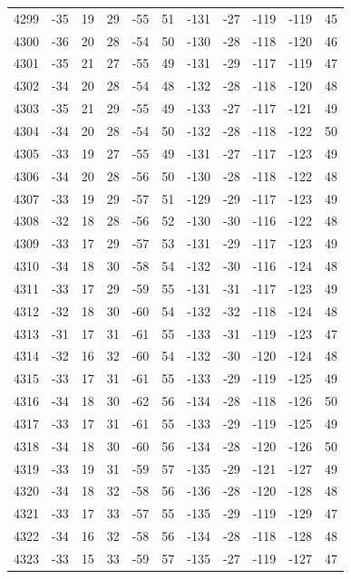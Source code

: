 \begin{table}[H]
\begin{tabular}{lllllllllll}
4299 & -35 & 19 & 29 & -55 & 51 & -131 & -27 & -119 & -119 & 45 \\
4300 & -36 & 20 & 28 & -54 & 50 & -130 & -28 & -118 & -120 & 46 \\
4301 & -35 & 21 & 27 & -55 & 49 & -131 & -29 & -117 & -119 & 47 \\
4302 & -34 & 20 & 28 & -54 & 48 & -132 & -28 & -118 & -120 & 48 \\
4303 & -35 & 21 & 29 & -55 & 49 & -133 & -27 & -117 & -121 & 49 \\
4304 & -34 & 20 & 28 & -54 & 50 & -132 & -28 & -118 & -122 & 50 \\
4305 & -33 & 19 & 27 & -55 & 49 & -131 & -27 & -117 & -123 & 49 \\
4306 & -34 & 20 & 28 & -56 & 50 & -130 & -28 & -118 & -122 & 48 \\
4307 & -33 & 19 & 29 & -57 & 51 & -129 & -29 & -117 & -123 & 49 \\
4308 & -32 & 18 & 28 & -56 & 52 & -130 & -30 & -116 & -122 & 48 \\
4309 & -33 & 17 & 29 & -57 & 53 & -131 & -29 & -117 & -123 & 49 \\
4310 & -34 & 18 & 30 & -58 & 54 & -132 & -30 & -116 & -124 & 48 \\
4311 & -33 & 17 & 29 & -59 & 55 & -131 & -31 & -117 & -123 & 49 \\
4312 & -32 & 18 & 30 & -60 & 54 & -132 & -32 & -118 & -124 & 48 \\
4313 & -31 & 17 & 31 & -61 & 55 & -133 & -31 & -119 & -123 & 47 \\
4314 & -32 & 16 & 32 & -60 & 54 & -132 & -30 & -120 & -124 & 48 \\
4315 & -33 & 17 & 31 & -61 & 55 & -133 & -29 & -119 & -125 & 49 \\
4316 & -34 & 18 & 30 & -62 & 56 & -134 & -28 & -118 & -126 & 50 \\
4317 & -33 & 17 & 31 & -61 & 55 & -133 & -29 & -119 & -125 & 49 \\
4318 & -34 & 18 & 30 & -60 & 56 & -134 & -28 & -120 & -126 & 50 \\
4319 & -33 & 19 & 31 & -59 & 57 & -135 & -29 & -121 & -127 & 49 \\
4320 & -34 & 18 & 32 & -58 & 56 & -136 & -28 & -120 & -128 & 48 \\
4321 & -33 & 17 & 33 & -57 & 55 & -135 & -29 & -119 & -129 & 47 \\
4322 & -34 & 16 & 32 & -58 & 56 & -134 & -28 & -118 & -128 & 48 \\
4323 & -33 & 15 & 33 & -59 & 57 & -135 & -27 & -119 & -127 & 47 \\

\end{tabular}
\end{table}
